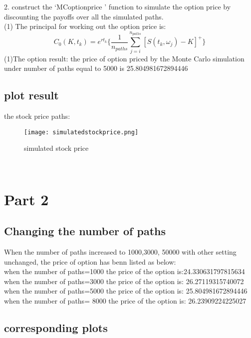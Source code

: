 \documentclass[14pt]{extarticle}
\begin{document}
2. construct the ‘MCoptionprice ’ function to simulate the option price by discounting the payoffs over all the simulated paths.\\

(1) The principal for working out the option price is:
$$ C_0(K,t_k)=e^{rt_k}\{   \frac{1}{n_{paths}}  \sum_{j=i}^{n_{paths}}  {[S(t_k,\omega_j)-K]}^+  \} $$
(1)The option result: 
the price of option priced by the Monte Carlo simulation under number of paths equal to 5000 is 25.804981672894446



\newpage
\subsection{plot result}
the stock price paths:\\ 
\begin{figure}[h] 
    \centering 
    \texttt{[image: simulatedstockprice.png]} 
\caption{ simulated stock price}
 \end{figure}
\\

\section{Part 2}
\subsection{Changing the number of paths}
When the number of paths increased to 1000,3000, 50000 with other setting unchanged, the  price of option has benn listed as below:\\
when the number of paths=1000
the price of the option is:24.330631797815634\\
when the number of paths=3000
the price of the option is: 26.27119315740072\\
when the number of paths=5000
the price of the option is: 25.804981672894446\\
when the number of paths= 8000
the price of the option is: 26.23909224225027


\newpage
\subsection{corresponding plots}
\end{document}
